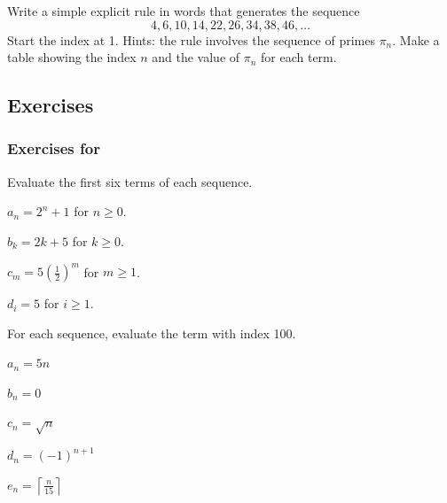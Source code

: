 \begin{act}
\begin{actpart}
        \item Write a simple explicit rule in words that generates the sequence
                $$4,6,10,14,22,26,34,38,46,\ldots$$
        Start the index at 1. Hints: the rule involves the sequence of primes $\pi_n$. Make a table showing the index $n$ and the value of $\pi_n$ for each term. %
    \end{actpart}
\end{act}


\subsection{Exercises}


\subsubsection*{Exercises for  \subdefnseq}

\begin{exer}[\exerP] %
\label{exer_eval_seq_first_six}
    Evaluate the first six terms of each sequence. 
        \begin{exerpart}
            \item $a_n = 2^n +1$ for $n \ge 0$.
            \item $b_k = 2k+5$ for $k \ge 0$.
            \item $c_m= 5\left(\frac{1}{2} \right)^m$ for $m \ge 1$.
            \item $d_i= 5$ for $i \ge 1$.
        \end{exerpart}
\end{exer}

\begin{exer}[\exerP] %
\label{exer_eval_seq_100th_term}
    For each sequence, evaluate the term with index 100.
        \begin{exerpart}
            \item $a_n= 5n$
            \item $b_n=0$
            \item $c_n = \sqrt{n}$
            \item $d_n= (-1)^{n+1}$
            \item $e_n= \left\lceil \frac{n}{15}\right\rceil$
        \end{exerpart}    
\end{exer}

